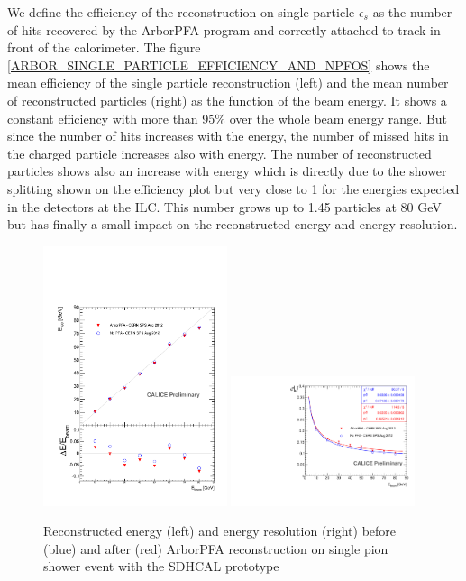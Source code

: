 \documentclass[cits]{JINST}
\begin{document}
We define the efficiency of the reconstruction on single particle $\epsilon_s$ as the number of hits recovered by the ArborPFA program and correctly attached to track in front of the calorimeter. The figure \ref{ARBOR_SINGLE_PARTICLE_EFFICIENCY_AND_NPFOS} shows the mean efficiency of the single particle reconstruction (left) and the mean number of reconstructed particles (right) as the function of the beam energy. It shows a constant efficiency with more than 95\% over the whole beam energy range. But since the number of hits increases with the energy, the number of missed hits in the charged particle increases also with energy. The number of reconstructed particles shows also an increase with energy which is directly due to the shower splitting shown on the efficiency plot but very close to 1 for the energies expected in the detectors at the ILC. This number grows up to 1.45 particles at 80 GeV but has finally a small impact on the reconstructed energy and energy resolution.

\begin{figure}[!h]
  \begin{center}
    \includegraphics[width=0.48\textwidth]{plots/SingleParticle_ERec.pdf}
    \includegraphics[width=0.48\textwidth]{plots/SingleParticle_EResol.pdf} \\
  \end{center}
  \caption{\label{ARBOR_SINGLE_PARTICLE_EREC_AND_ERESOL} Reconstructed energy (left) and energy resolution (right) before (blue) and after (red) ArborPFA reconstruction on single pion shower event with the SDHCAL prototype}
\end{figure}
\end{document}
